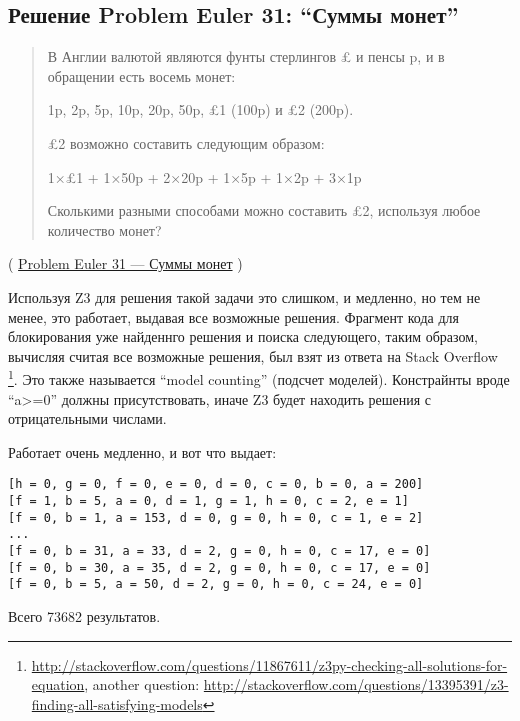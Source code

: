 \subsection{Решение Problem Euler 31: ``Суммы монет''}

\begin{framed}
\begin{quotation}
В Англии валютой являются фунты стерлингов £ и пенсы p, и в обращении есть восемь монет:

    1p, 2p, 5p, 10p, 20p, 50p, £1 (100p) и £2 (200p).

£2 возможно составить следующим образом:

    1×£1 + 1×50p + 2×20p + 1×5p + 1×2p + 3×1p

Сколькими разными способами можно составить £2, используя любое количество монет?
\end{quotation}
\end{framed}
( \href{http://euler.jakumo.org/problems/view/31.html}{Problem Euler 31 --- Суммы монет} )

\label{SMTEnumerate}
Используя Z3 для решения такой задачи это слишком, и медленно, но тем не менее, это работает, выдавая все возможные решения.
Фрагмент кода для блокирования уже найденнго решения и поиска следующего, таким образом, вычисляя считая все возможные решения,
был взят из ответа на Stack Overflow
\footnote{\url{http://stackoverflow.com/questions/11867611/z3py-checking-all-solutions-for-equation}, 
another question: \url{http://stackoverflow.com/questions/13395391/z3-finding-all-satisfying-models}}.
Это также называется ``model counting'' (подсчет моделей).
Констрайнты вроде ``a>=0'' должны присутствовать, иначе Z3 будет находить решения с отрицательными числами.



Работает очень медленно, и вот что выдает:

\begin{lstlisting}
[h = 0, g = 0, f = 0, e = 0, d = 0, c = 0, b = 0, a = 200]
[f = 1, b = 5, a = 0, d = 1, g = 1, h = 0, c = 2, e = 1]
[f = 0, b = 1, a = 153, d = 0, g = 0, h = 0, c = 1, e = 2]
...
[f = 0, b = 31, a = 33, d = 2, g = 0, h = 0, c = 17, e = 0]
[f = 0, b = 30, a = 35, d = 2, g = 0, h = 0, c = 17, e = 0]
[f = 0, b = 5, a = 50, d = 2, g = 0, h = 0, c = 24, e = 0]
\end{lstlisting}

Всего 73682 результатов.
